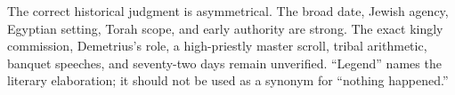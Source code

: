 The correct historical judgment is asymmetrical. The broad date, Jewish agency, Egyptian setting, Torah scope, and early authority are strong. The exact kingly commission, Demetrius's role, a high-priestly master scroll, tribal arithmetic, banquet speeches, and seventy-two days remain unverified. “Legend” names the literary elaboration; it should not be used as a synonym for “nothing happened.”

